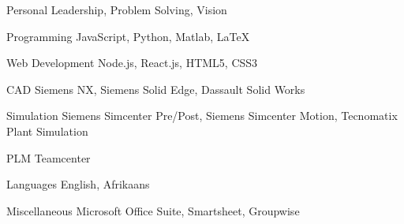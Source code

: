 

\begin{cvskills}
  \cvskill
    {Personal} %
    {Leadership, Problem Solving, Vision} %

  \cvskill
    {Programming} %
    {JavaScript, Python, Matlab, LaTeX} %
  
  \cvskill
    {Web Development} %
    {Node.js, React.js, HTML5, CSS3} %

  \cvskill
    {CAD} %
    {Siemens NX, Siemens Solid Edge, Dassault Solid Works} %

  \cvskill
    {Simulation} %
    {Siemens Simcenter Pre/Post, Siemens Simcenter Motion, Tecnomatix Plant Simulation} %


  \cvskill
    {PLM} %
    {Teamcenter} %

  \cvskill
    {Languages} %
    {English, Afrikaans} %
  
  \cvskill
    {Miscellaneous}
    {Microsoft Office Suite, Smartsheet, Groupwise}

\end{cvskills}
